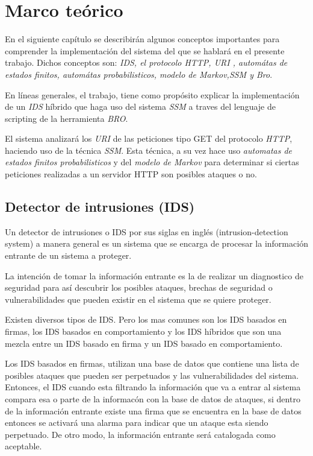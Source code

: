 \chapter{Marco teórico}
\label{capitulo1}


En el siguiente cap\'itulo se describir\'an algunos conceptos importantes para comprender la implementaci\'on del sistema del que se hablar\'a en el presente trabajo. Dichos conceptos son: \textit{IDS, el protocolo HTTP, URI , autom\'atas de estados finitos, autom\'atas probabilisticos, modelo de Markov,SSM y Bro}.

En l\'ineas generales, el trabajo, tiene como prop\'osito explicar la implementaci\'on de un \textit{IDS} híbrido que haga uso del sistema \textit{SSM} a traves del lenguaje de scripting de la herramienta \textit{BRO}.

El sistema analizar\'a los \textit{URI} de las peticiones tipo GET del protocolo \textit{HTTP}, haciendo uso de la t\'ecnica \textit{SSM}. Esta t\'ecnica, a su vez hace uso \textit{automatas de estados finitos probabilisticos} y del \textit{modelo de Markov} para determinar si ciertas peticiones realizadas a un servidor HTTP son posibles ataques o no.

\section{Detector de intrusiones (IDS)}
Un detector de intrusiones o IDS por sus siglas en ingl\'es (intrusion-detection system) a manera general es un sistema que se encarga de procesar la informaci\'on entrante de un sistema a proteger.

La intenci\'on de tomar la informaci\'on entrante es la de realizar un diagnostico de seguridad para as\'i descubrir los posibles ataques, brechas de seguridad o vulnerabilidades que pueden existir en el sistema que se quiere proteger.

Existen diversos tipos de IDS. Pero los mas comunes son los IDS basados en firmas, los IDS basados en comportamiento y los IDS h\'ibridos que son una mezcla entre un IDS basado en firma y un IDS basado en comportamiento.

Los IDS basados en firmas, utilizan una base de datos que contiene una lista de posibles ataques que pueden ser perpetuados y las vulnerabilidades del sistema. Entonces, el IDS cuando esta filtrando la informaci\'on que va a entrar al sistema compara esa o parte de la informac\'on con la base de datos de ataques, si dentro de la informaci\'on entrante existe una firma que se encuentra en la base de datos entonces se activar\'a una alarma para indicar que un ataque esta siendo perpetuado. De otro modo, la informaci\'on entrante ser\'a  catalogada como aceptable.

